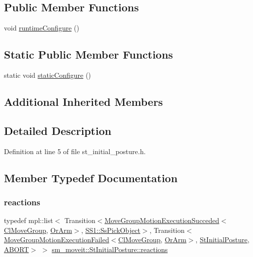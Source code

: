 \subsection*{Public Member Functions}
\begin{DoxyCompactItemize}
\item 
void \hyperlink{structsm__moveit_1_1StInitialPosture_af6985ad418eb655f35bd182973d7234a}{runtime\+Configure} ()
\end{DoxyCompactItemize}
\subsection*{Static Public Member Functions}
\begin{DoxyCompactItemize}
\item 
static void \hyperlink{structsm__moveit_1_1StInitialPosture_a54a2a80bf9a9b5d6838d727bc6ebff3f}{static\+Configure} ()
\end{DoxyCompactItemize}
\subsection*{Additional Inherited Members}


\subsection{Detailed Description}


Definition at line 5 of file st\+\_\+initial\+\_\+posture.\+h.



\subsection{Member Typedef Documentation}
\mbox{\label{structsm__moveit_1_1StInitialPosture_a0ca17de7a1f01a6c8e8904efb027f218}} 
\subsubsection{\texorpdfstring{reactions}{reactions}}
{\footnotesize\ttfamily typedef mpl\+::list$<$ Transition$<$\hyperlink{structmoveit__z__client_1_1MoveGroupMotionExecutionSucceded}{Move\+Group\+Motion\+Execution\+Succeded}$<$\hyperlink{classmoveit__z__client_1_1ClMoveGroup}{Cl\+Move\+Group}, \hyperlink{classsm__moveit_1_1OrArm}{Or\+Arm}$>$, \hyperlink{structsm__moveit_1_1SS1_1_1SsPickObject}{S\+S1\+::\+Ss\+Pick\+Object}$>$, Transition$<$\hyperlink{structmoveit__z__client_1_1MoveGroupMotionExecutionFailed}{Move\+Group\+Motion\+Execution\+Failed}$<$\hyperlink{classmoveit__z__client_1_1ClMoveGroup}{Cl\+Move\+Group}, \hyperlink{classsm__moveit_1_1OrArm}{Or\+Arm}$>$, \hyperlink{structsm__moveit_1_1StInitialPosture}{St\+Initial\+Posture}, \hyperlink{classABORT}{A\+B\+O\+RT}$>$ $>$ \hyperlink{structsm__moveit_1_1StInitialPosture_a0ca17de7a1f01a6c8e8904efb027f218}{sm\+\_\+moveit\+::\+St\+Initial\+Posture\+::reactions}}



